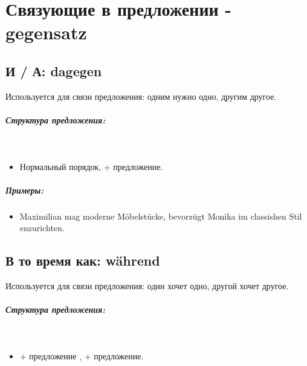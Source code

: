 \chapter{Связующие в предложении - gegensatz}

\section{И / А: dagegen}

Используется для связи предложения: одним нужно одно,  другим другое.

\paragraph{Структура предложения:} ~\\
\begin{itemize}
\item Нормальный порядок,  \dverb{} + предложение.
\end{itemize}

\paragraph{Примеры:}
\begin{itemize}
    \item Maximilian mag moderne Möbelstücke,  bevorzügt Monika im classishen Stil enzurichten.
          ~\\ 
\end{itemize}

\section{В то время как: während}

Используется для связи предложения:  один хочет одно, другой хочет другое.

\paragraph{Структура предложения:} ~\\
\begin{itemize}
\item {} + предложение \dverb{}, \dverb{} + предложение.
\end{itemize}

